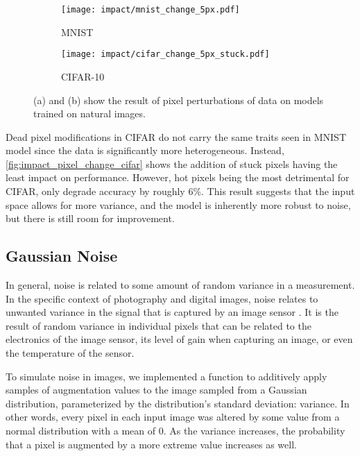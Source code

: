 \documentclass[conference]{IEEEtran}
\begin{document}
\begin{figure}[H]
    \centering
    \begin{subfigure}{0.45\columnwidth}
        \centering
        \texttt{[image: impact/mnist\_change\_5px.pdf]}
        \caption{MNIST}
        \label{fig:impact_pixel_change_mnist}
    \end{subfigure}
    \begin{subfigure}{0.45\columnwidth}
        \centering
        \texttt{[image: impact/cifar\_change\_5px\_stuck.pdf]}
        \caption{CIFAR-10}
        \label{fig:impact_pixel_change_cifar}
    \end{subfigure}
    \captionsetup{width=0.90\columnwidth}
    \caption{(a) and (b) show the result of pixel perturbations of data on models trained on natural images.}
    \label{fig:impact_pixel_change}
\end{figure}

Dead pixel modifications in CIFAR do not carry the same traits seen in MNIST model since the data is significantly more heterogeneous. Instead, \autoref{fig:impact_pixel_change_cifar} shows the addition of stuck pixels having the least impact on performance. However, hot pixels being the most detrimental for CIFAR, only degrade accuracy by roughly 6\%. This result suggests that the input space allows for more variance, and the model is inherently more robust to noise, but there is still room for improvement.

\subsection{Gaussian Noise}

In general, noise is related to some amount of random variance in a measurement. In the specific context of photography and digital images, noise relates to unwanted variance in the signal that is captured by an image sensor \cite{photoencyc}. It is the result of random variance in individual pixels that can be related to the electronics of the image sensor, its level of gain when capturing an image, or even the temperature of the sensor.

To simulate noise in images, we implemented a function to additively apply samples of augmentation values to the image sampled from a Gaussian distribution, parameterized by the distribution’s standard deviation: variance. In other words, every pixel in each input image was altered by some value from a normal distribution with a mean of 0. As the variance increases, the probability that a pixel is augmented by a more extreme value increases as well.
\end{document}
